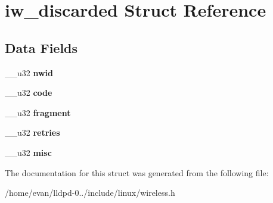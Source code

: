 \section{iw\-\_\-discarded \-Struct \-Reference}
\label{structiw__discarded}
\subsection*{\-Data \-Fields}
\begin{DoxyCompactItemize}
\item 
\-\_\-\-\_\-u32 {\bfseries nwid}\label{structiw__discarded_a937461016e49bd3e952c0f5f52e2861f}

\item 
\-\_\-\-\_\-u32 {\bfseries code}\label{structiw__discarded_ae361e15f6449f3650539199d416d7fd6}

\item 
\-\_\-\-\_\-u32 {\bfseries fragment}\label{structiw__discarded_a4726564bb8d30c41cd2c80afb19b1003}

\item 
\-\_\-\-\_\-u32 {\bfseries retries}\label{structiw__discarded_a31fd99bf2ada3c7dc5d9774a22737115}

\item 
\-\_\-\-\_\-u32 {\bfseries misc}\label{structiw__discarded_a9ac3231315784a229ca77965a7b7304f}

\end{DoxyCompactItemize}


\-The documentation for this struct was generated from the following file\-:\begin{DoxyCompactItemize}
\item 
/home/evan/lldpd-\/0../include/linux/wireless.\-h\end{DoxyCompactItemize}
